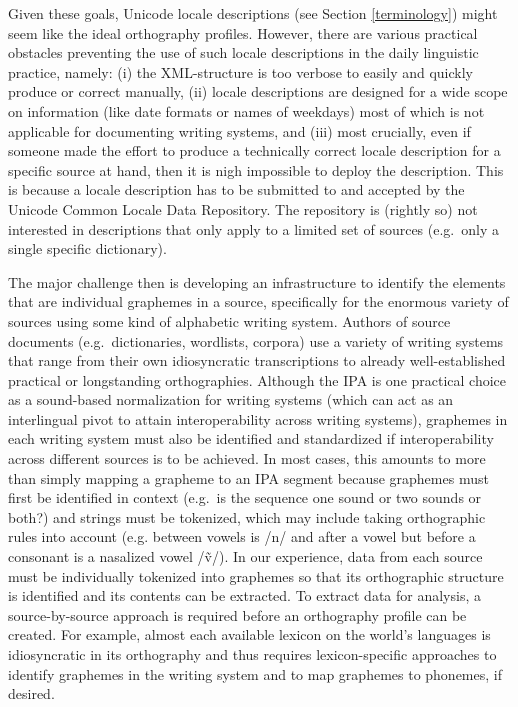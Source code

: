 Given these goals, Unicode locale descriptions (see Section \ref{terminology}) might seem like the ideal orthography profiles. However, there are various practical obstacles preventing the use of such locale descriptions in the daily linguistic practice, namely: (i) the XML-structure is too verbose to easily and quickly produce or correct manually, (ii) locale descriptions are designed for a wide scope on information (like date formats or names of weekdays) most of which is not applicable for documenting writing systems, and (iii) most crucially, even if someone made the effort to produce a technically correct locale description for a specific source at hand, then it is nigh impossible to deploy the description. This is because a locale description has to be submitted to and accepted by the Unicode Common Locale Data Repository. The repository is (rightly so) not interested in descriptions that only apply to a limited set of sources (e.g.~only a single specific dictionary).

The major challenge then is developing an infrastructure to identify the elements that are individual graphemes in a source, specifically for the enormous variety of sources using some kind of alphabetic writing system. Authors of source documents (e.g.~dictionaries, wordlists, corpora) use a variety of writing systems that range from their own idiosyncratic transcriptions to already well-established practical or longstanding orthographies. Although the IPA is one practical choice as a sound-based normalization for writing systems (which can act as an interlingual pivot to attain interoperability across writing systems), graphemes in each writing system must also be identified and standardized if interoperability across different sources is to be achieved. In most cases, this amounts to more than simply mapping a grapheme to an IPA segment because graphemes must first be identified in context (e.g.~is the sequence one sound or two sounds or both?) and strings must be tokenized, which may include taking orthographic rules into account (e.g. between vowels is /n/ and after a vowel but before a consonant is a nasalized vowel /ṽ/). In our experience, data from each source must be individually tokenized into graphemes so that its orthographic structure is identified and its contents can be extracted. To extract data for analysis, a source-by-source approach is required before an orthography profile can be created. For example, almost each available lexicon on the world's languages is idiosyncratic in its orthography and thus requires lexicon-specific approaches to identify graphemes in the writing system and to map graphemes to phonemes, if desired.

